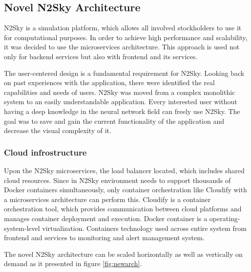 \subsection{Novel N2Sky Architecture}\label{Contemporary N2Sky Architecture}

N2Sky is a simulation platform, which allows all involved stockholders to use it for computational purposes. In order to achieve high performance and scalability, it was decided to use the microservices architecture. This approach is used not only for backend services but also with frontend and its services.

The user-centered design is a fundamental requirement for N2Sky. Looking back on past experiences with the application, there were identified the real capabilities and needs of users. N2Sky was moved from a complex monolithic system to an easily understandable application. Every interested user without having a deep knowledge in the neural network field can freely use N2Sky.  The goal was to save and gain the current functionality of the application and decrease the visual complexity of it. 

\subsubsection{Cloud infrostructure}\label{Cloud infrostructure}


Upon the N2Sky microservices, the load balancer located, which includes shared cloud resources. Since in N2Sky environment needs to support thousands of Docker containers \cite{docker} simultaneously, only container orchestration like Cloudify \cite{cloudify} with a microservices architecture can perform this.  Cloudify is a container orchestration tool, which provides communication between cloud platforms and manages container deployment and execution. Docker container is a operating-system-level virtualization. Containers technology used across entire system from frontend and services to monitoring and alert management system. 

The novel N2Sky architecture can be scaled horizontally as well as vertically on demand as it presented in figure \ref{fig:newarch}.

